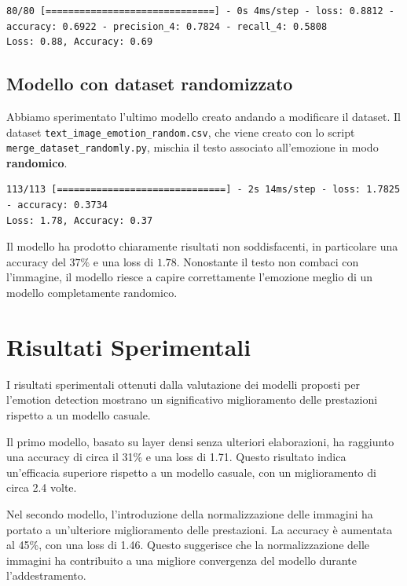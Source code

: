 \documentclass{article}
\begin{document}
\begin{lstlisting}
80/80 [==============================] - 0s 4ms/step - loss: 0.8812 - accuracy: 0.6922 - precision_4: 0.7824 - recall_4: 0.5808
Loss: 0.88, Accuracy: 0.69
\end{lstlisting}

\subsection{Modello con dataset randomizzato}
Abbiamo sperimentato l'ultimo modello creato andando a modificare il dataset. Il dataset \verb|text_image_emotion_random.csv|, che viene creato con lo script \verb|merge_dataset_randomly.py|, mischia il testo associato all'emozione in modo \textbf{randomico}.

\begin{lstlisting}
113/113 [==============================] - 2s 14ms/step - loss: 1.7825 - accuracy: 0.3734
Loss: 1.78, Accuracy: 0.37
\end{lstlisting}

Il modello ha prodotto chiaramente risultati non soddisfacenti, in particolare una accuracy del $37\%$ e una loss di $1.78$.
Nonostante il testo non combaci con l'immagine, il modello riesce a capire correttamente l'emozione meglio di un modello completamente randomico.

\section{Risultati Sperimentali}
I risultati sperimentali ottenuti dalla valutazione dei modelli proposti per l'emotion detection mostrano un significativo miglioramento delle prestazioni rispetto a un modello casuale. 

\bigskip

Il primo modello, basato su layer densi senza ulteriori elaborazioni, ha raggiunto una accuracy di circa il 31\% e una loss di 1.71. Questo risultato indica un'efficacia superiore rispetto a un modello casuale, con un miglioramento di circa 2.4 volte.

\bigskip

Nel secondo modello, l'introduzione della normalizzazione delle immagini ha portato a un'ulteriore miglioramento delle prestazioni. La accuracy è aumentata al 45\%, con una loss di 1.46. Questo suggerisce che la normalizzazione delle immagini ha contribuito a una migliore convergenza del modello durante l'addestramento.

\bigskip
\end{document}
